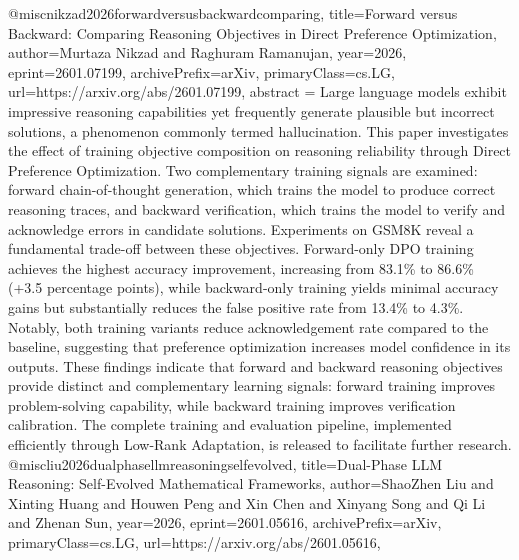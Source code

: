 {}@misc{nikzad2026forwardversusbackwardcomparing,
      title={Forward versus Backward: Comparing Reasoning Objectives in Direct Preference Optimization}, 
      author={Murtaza Nikzad and Raghuram Ramanujan},
      year={2026},
      eprint={2601.07199},
      archivePrefix={arXiv},
      primaryClass={cs.LG},
      url={https://arxiv.org/abs/2601.07199},
      abstract = {Large language models exhibit impressive reasoning capabilities yet frequently generate plausible but incorrect solutions, a phenomenon commonly termed hallucination. This paper investigates the effect of training objective composition on reasoning reliability through Direct Preference Optimization. Two complementary training signals are examined: forward chain-of-thought generation, which trains the model to produce correct reasoning traces, and backward verification, which trains the model to verify and acknowledge errors in candidate solutions. Experiments on GSM8K reveal a fundamental trade-off between these objectives. Forward-only DPO training achieves the highest accuracy improvement, increasing from 83.1\% to 86.6\% (+3.5 percentage points), while backward-only training yields minimal accuracy gains but substantially reduces the false positive rate from 13.4\% to 4.3\%. Notably, both training variants reduce acknowledgement rate compared to the baseline, suggesting that preference optimization increases model confidence in its outputs. These findings indicate that forward and backward reasoning objectives provide distinct and complementary learning signals: forward training improves problem-solving capability, while backward training improves verification calibration. The complete training and evaluation pipeline, implemented efficiently through Low-Rank Adaptation, is released to facilitate further research.}
}@misc{liu2026dualphasellmreasoningselfevolved,
      title={Dual-Phase LLM Reasoning: Self-Evolved Mathematical Frameworks}, 
      author={ShaoZhen Liu and Xinting Huang and Houwen Peng and Xin Chen and Xinyang Song and Qi Li and Zhenan Sun},
      year={2026},
      eprint={2601.05616},
      archivePrefix={arXiv},
      primaryClass={cs.LG},
      url={https://arxiv.org/abs/2601.05616},
}
